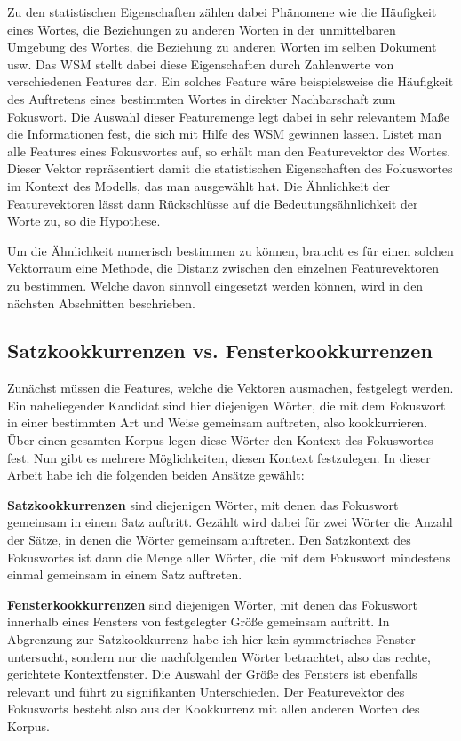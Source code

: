 \documentclass[11pt,numbers=noenddot]{scrartcl}
\begin{document}
Zu den statistischen Eigenschaften zählen dabei Phänomene wie die Häufigkeit eines Wortes, die Beziehungen zu anderen Worten in der unmittelbaren Umgebung des Wortes, die Beziehung zu anderen Worten im selben Dokument usw. Das WSM stellt dabei diese Eigenschaften durch Zahlenwerte von verschiedenen Features dar. Ein solches Feature wäre beispielsweise die Häufigkeit des Auftretens eines bestimmten Wortes in direkter Nachbarschaft zum Fokuswort. Die Auswahl dieser Featuremenge legt dabei in sehr relevantem Maße die Informationen fest, die sich mit Hilfe des WSM gewinnen lassen. Listet man alle Features eines Fokuswortes auf, so erhält man den Featurevektor des Wortes. Dieser Vektor repräsentiert damit die statistischen Eigenschaften des Fokuswortes im Kontext des Modells, das man ausgewählt hat. Die Ähnlichkeit der Featurevektoren lässt dann Rückschlüsse auf die Bedeutungsähnlichkeit der Worte zu, so die Hypothese.

Um die Ähnlichkeit numerisch bestimmen zu können, braucht es für einen solchen Vektorraum eine Methode, die Distanz zwischen den einzelnen Featurevektoren zu bestimmen. Welche davon sinnvoll eingesetzt werden können, wird in den nächsten Abschnitten beschrieben.

\subsection{Satzkookkurrenzen vs. Fensterkookkurrenzen}

Zunächst müssen die Features, welche die Vektoren ausmachen, festgelegt werden. Ein naheliegender Kandidat sind hier diejenigen Wörter, die mit dem Fokuswort in einer bestimmten Art und Weise gemeinsam auftreten, also kookkurrieren. Über einen gesamten Korpus legen diese Wörter den Kontext des Fokuswortes fest. Nun gibt es mehrere Möglichkeiten, diesen Kontext festzulegen. In dieser Arbeit habe ich die folgenden beiden Ansätze gewählt:

\textbf{Satzkookkurrenzen} sind diejenigen Wörter, mit denen das Fokuswort gemeinsam in einem Satz auftritt. Gezählt wird dabei für zwei Wörter die Anzahl der Sätze, in denen die Wörter gemeinsam auftreten. Den Satzkontext des Fokuswortes ist dann die Menge aller Wörter, die mit dem Fokuswort mindestens einmal gemeinsam in einem Satz auftreten.

\textbf{Fensterkookkurrenzen} sind diejenigen Wörter, mit denen das Fokuswort innerhalb eines Fensters von festgelegter Größe gemeinsam auftritt. In Abgrenzung zur Satzkookkurrenz habe ich hier kein symmetrisches Fenster untersucht, sondern nur die nachfolgenden Wörter betrachtet, also das rechte, gerichtete Kontextfenster. Die Auswahl der Größe des Fensters ist ebenfalls relevant und führt zu signifikanten Unterschieden. Der Featurevektor des Fokusworts besteht also aus der Kookkurrenz mit allen anderen Worten des Korpus.
\end{document}
